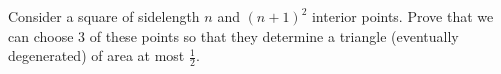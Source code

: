 Consider a square of sidelength $ n$ and $ (n+1)^2$ interior points. Prove that we can choose $ 3$ of these points so that they determine a triangle (eventually degenerated) of area at most $ \frac12$.